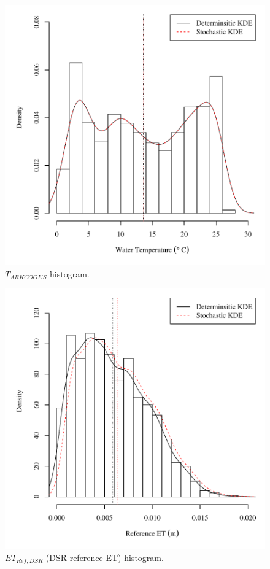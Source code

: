 \begin{center}
\begin{figure}[htbp]
	\includegraphics[width=6in]{"Figures/Results_DSR/V density tout"}
	\caption{$T_{ARKCOOKS}$ histogram.}
\end{figure}
\end{center}
\newpage

\begin{center}
\begin{figure}[htbp]
	\includegraphics[width=6in]{"Figures/Results_DSR/V density et"}
	\caption{$ET_{Ref,DSR}$ (DSR reference ET) histogram.}
\end{figure}
\end{center}
\newpage

